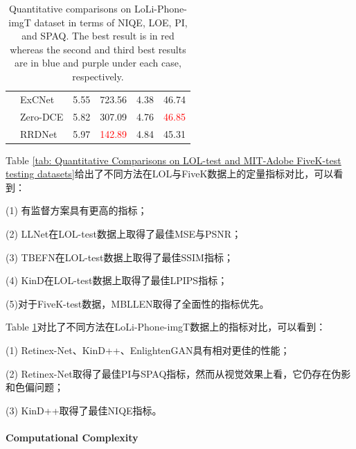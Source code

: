 \documentclass[letterpaper,12pt]{article}
\begin{document}
\begin{table}[!htbp]
\begin{tabular}{>{\centering\arraybackslash}m{2cm}|>{\centering\arraybackslash}m{2.5cm}|c|c|c|c}
				\hline
				
				\multirowcell{3}{ZSL}& ExCNet& 5.55 & 723.56 & 4.38 & 46.74   \\
				& Zero-DCE& 5.82 & 307.09 & 4.76 & \textcolor{red}{46.85}   \\
				& RRDNet  & 5.97 & \textcolor{red}{142.89} & 4.84 & 45.31   \\
				
				
				\hline
				
			\end{tabular}
		\captionsetup{font=scriptsize} %
		\caption{\label{tab: Quantitative comparisons on LoLi-Phone-imgT dataset}
			Quantitative comparisons on LoLi-Phone-imgT dataset in terms of NIQE, LOE, PI, and SPAQ. The best result is in red whereas the second and third best results are in blue and purple under each case, respectively.} %
		
	\end{table}
	
	Table \ref{tab: Quantitative Comparisons on LOL-test and MIT-Adobe FiveK-test testing datasets}给出了不同方法在LOL与FiveK数据上的定量指标对比，可以看到：
	
	
	(1) 有监督方案具有更高的指标；
	
	(2) LLNet在LOL-test数据上取得了最佳MSE与PSNR；
	
	(3) TBEFN在LOL-test数据上取得了最佳SSIM指标；
	
	(4) KinD在LOL-test数据上取得了最佳LPIPS指标；	
	
	(5)对于FiveK-test数据，MBLLEN取得了全面性的指标优先。
	
	
	Table \ref{tab: Quantitative comparisons on LoLi-Phone-imgT dataset}对比了不同方法在LoLi-Phone-imgT数据上的指标对比，可以看到：
	
	(1) Retinex-Net、KinD++、EnlightenGAN具有相对更佳的性能；
	
	(2) Retinex-Net取得了最佳PI与SPAQ指标，然而从视觉效果上看，它仍存在伪影和色偏问题；
	
	(3) KinD++取得了最佳NIQE指标。
	
	\paragraph{Computational Complexity} \qquad
	
\end{document}
